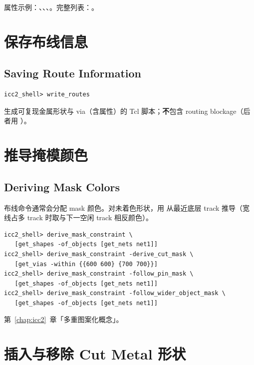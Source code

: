 属性示例：、、、。完整列表：。

\section{保存布线信息}
\subsection*{Saving Route Information}

\begin{lstlisting}
icc2_shell> write_routes
\end{lstlisting}

生成可复现金属形状与 via（含属性）的 Tcl 脚本；\textbf{不}包含 routing blockage（后者用 ）。

\section{推导掩模颜色}
\subsection*{Deriving Mask Colors}

布线命令通常会分配 mask 颜色。对未着色形状，用  从最近底层 track 推导（宽线占多 track 时取与下一空闲 track 相反颜色）。

\begin{lstlisting}
icc2_shell> derive_mask_constraint \
   [get_shapes -of_objects [get_nets net1]]
icc2_shell> derive_mask_constraint -derive_cut_mask \
   [get_vias -within {{600 600} {700 700}}]
icc2_shell> derive_mask_constraint -follow_pin_mask \
   [get_shapes -of_objects [get_nets net1]]
icc2_shell> derive_mask_constraint -follow_wider_object_mask \
   [get_shapes -of_objects [get_nets net1]]
\end{lstlisting}

\begin{seeAlsoBox}
第~\ref{chap:icc2}~章「多重图案化概念」。
\end{seeAlsoBox}

\section{插入与移除 Cut Metal 形状}
